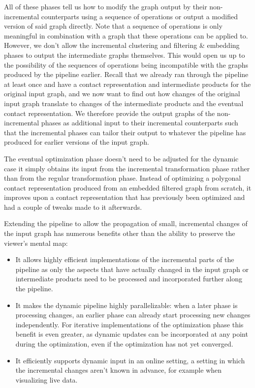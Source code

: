 All of these phases tell us how to modify the graph output by their non-incremental counterparts using a sequence of operations or output a modified version of said graph directly. Note that a sequence of operations is only meaningful in combination with a graph that these operations can be applied to. However, we don't allow the incremental clustering and filtering \& embedding phases to output the intermediate graphs themselves. This would open us up to the possibility of the sequences of operations being incompatible with the graphs produced by the pipeline earlier. Recall that we already ran through the pipeline at least once and have a contact representation and intermediate products for the original input graph, and we now want to find out how changes of the original input graph translate to changes of the intermediate products and the eventual contact representation. We therefore provide the output graphs of the non-incremental phases as additional input to their incremental counterparts such that the incremental phases can tailor their output to whatever the pipeline has produced for earlier versions of the input graph.

The eventual optimization phase doesn't need to be adjusted for the dynamic case \emdash{} it simply obtains its input from the incremental transformation phase rather than from the regular transformation phase. Instead of optimizing a polygonal contact representation produced from an embedded filtered graph from scratch, it improves upon a contact representation that has previously been optimized and had a couple of tweaks made to it afterwards.

Extending the pipeline to allow the propagation of small, incremental changes of the input graph has numerous benefits other than the ability to preserve the viewer's mental map:
%
\begin{itemize}
	\item It allows highly efficient implementations of the incremental parts of the pipeline as only the aspects that have actually changed in the input graph or intermediate products need to be processed and incorporated further along the pipeline.
	\item It makes the dynamic pipeline highly parallelizable: when a later phase is processing changes, an earlier phase can already start processing new changes independently. For iterative implementations of the optimization phase this benefit is even greater, as dynamic updates can be incorporated at any point during the optimization, even if the optimization has not yet converged.
	\item It efficiently supports dynamic input in an online setting, \ie{} a setting in which the incremental changes aren't known in advance, for example when visualizing live data.
\end{itemize}

